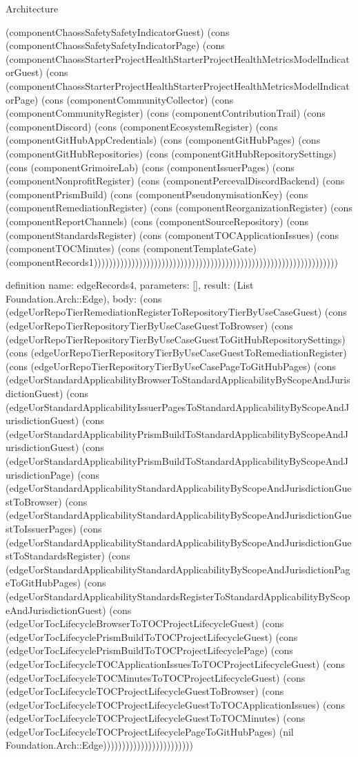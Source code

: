 \begin{lexlean}{Architecture}
\begin{semanticmodule}
{(componentChaossSafetySafetyIndicatorGuest) (cons (componentChaossSafetySafetyIndicatorPage) (cons (componentChaossStarterProjectHealthStarterProjectHealthMetricsModelIndicatorGuest) (cons (componentChaossStarterProjectHealthStarterProjectHealthMetricsModelIndicatorPage) (cons (componentCommunityCollector) (cons (componentCommunityRegister) (cons (componentContributionTrail) (cons (componentDiscord) (cons (componentEcosystemRegister) (cons (componentGitHubAppCredentials) (cons (componentGitHubPages) (cons (componentGitHubRepositories) (cons (componentGitHubRepositorySettings) (cons (componentGrimoireLab) (cons (componentIssuerPages) (cons (componentNonprofitRegister) (cons (componentPercevalDiscordBackend) (cons (componentPrismBuild) (cons (componentPseudonymisationKey) (cons (componentRemediationRegister) (cons (componentReorganizationRegister) (cons (componentReportChannels) (cons (componentSourceRepository) (cons (componentStandardsRegister) (cons (componentTOCApplicationIssues) (cons (componentTOCMinutes) (cons (componentTemplateGate) (componentRecords1)))))))))))))))))))))))))))))))))))))))))))))))))))))))))))))))))
}

definition{
  name: edgeRecords4,
  parameters: [],
  result: (List Foundation.Arch::Edge),
  body: (cons (edgeUorRepoTierRemediationRegisterToRepositoryTierByUseCaseGuest) (cons (edgeUorRepoTierRepositoryTierByUseCaseGuestToBrowser) (cons (edgeUorRepoTierRepositoryTierByUseCaseGuestToGitHubRepositorySettings) (cons (edgeUorRepoTierRepositoryTierByUseCaseGuestToRemediationRegister) (cons (edgeUorRepoTierRepositoryTierByUseCasePageToGitHubPages) (cons (edgeUorStandardApplicabilityBrowserToStandardApplicabilityByScopeAndJurisdictionGuest) (cons (edgeUorStandardApplicabilityIssuerPagesToStandardApplicabilityByScopeAndJurisdictionGuest) (cons (edgeUorStandardApplicabilityPrismBuildToStandardApplicabilityByScopeAndJurisdictionGuest) (cons (edgeUorStandardApplicabilityPrismBuildToStandardApplicabilityByScopeAndJurisdictionPage) (cons (edgeUorStandardApplicabilityStandardApplicabilityByScopeAndJurisdictionGuestToBrowser) (cons (edgeUorStandardApplicabilityStandardApplicabilityByScopeAndJurisdictionGuestToIssuerPages) (cons (edgeUorStandardApplicabilityStandardApplicabilityByScopeAndJurisdictionGuestToStandardsRegister) (cons (edgeUorStandardApplicabilityStandardApplicabilityByScopeAndJurisdictionPageToGitHubPages) (cons (edgeUorStandardApplicabilityStandardsRegisterToStandardApplicabilityByScopeAndJurisdictionGuest) (cons (edgeUorTocLifecycleBrowserToTOCProjectLifecycleGuest) (cons (edgeUorTocLifecyclePrismBuildToTOCProjectLifecycleGuest) (cons (edgeUorTocLifecyclePrismBuildToTOCProjectLifecyclePage) (cons (edgeUorTocLifecycleTOCApplicationIssuesToTOCProjectLifecycleGuest) (cons (edgeUorTocLifecycleTOCMinutesToTOCProjectLifecycleGuest) (cons (edgeUorTocLifecycleTOCProjectLifecycleGuestToBrowser) (cons (edgeUorTocLifecycleTOCProjectLifecycleGuestToTOCApplicationIssues) (cons (edgeUorTocLifecycleTOCProjectLifecycleGuestToTOCMinutes) (cons (edgeUorTocLifecycleTOCProjectLifecyclePageToGitHubPages) (nil Foundation.Arch::Edge))))))))))))))))))))))))
}


\end{semanticmodule}
\end{lexlean}
